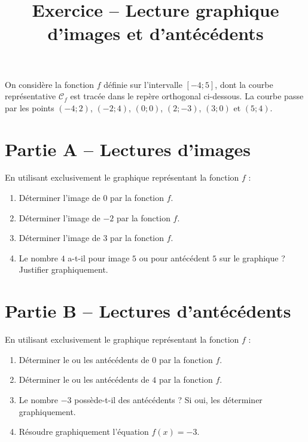 \documentclass[11pt,a4paper]{article}
\title{Exercice -- Lecture graphique d'images et d'antécédents}
\author{}
\date{}
\begin{document}
\maketitle

On considère la fonction $f$ définie sur l'intervalle $[-4 ; 5]$, dont la courbe représentative $\mathcal{C}_f$ est tracée dans le repère orthogonal ci-dessous. La courbe passe par les points $(-4 ; 2)$, $(-2 ; 4)$, $(0 ; 0)$, $(2 ; -3)$, $(3 ; 0)$ et $(5 ; 4)$.

\begin{center}
\end{center}

\section*{Partie A -- Lectures d'images}
En utilisant exclusivement le graphique représentant la fonction $f$ :
\begin{enumerate}
    \item Déterminer l'image de $0$ par la fonction $f$.
    \item Déterminer l'image de $-2$ par la fonction $f$.
    \item Déterminer l'image de $3$ par la fonction $f$.
    \item Le nombre $4$ a-t-il pour image $5$ ou pour antécédent $5$ sur le graphique ? Justifier graphiquement.
\end{enumerate}

\section*{Partie B -- Lectures d'antécédents}
En utilisant exclusivement le graphique représentant la fonction $f$ :
\begin{enumerate}
    \item Déterminer le ou les antécédents de $0$ par la fonction $f$.
    \item Déterminer le ou les antécédents de $4$ par la fonction $f$.
    \item Le nombre $-3$ possède-t-il des antécédents ? Si oui, les déterminer graphiquement.
    \item Résoudre graphiquement l'équation $f(x) = -3$.
\end{enumerate}
\end{document}

